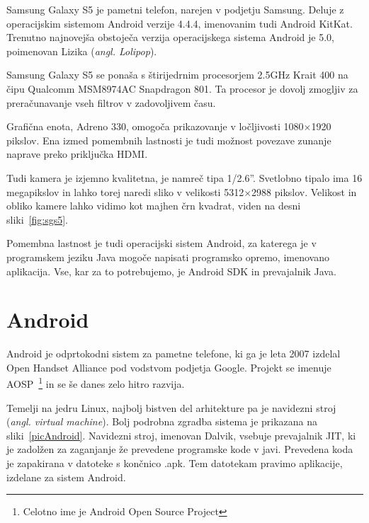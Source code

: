 \documentclass[a4paper, 12pt]{book}
\begin{document}
Samsung Galaxy S5 je pametni telefon, narejen v podjetju Samsung. Deluje z
operacijskim sistemom Android verzije 4.4.4, imenovanim tudi Android KitKat.
Trenutno najnovejša obstoječa verzija operacijskega sistema Android je 5.0,
poimenovan Lizika (\textit{angl. Lolipop}).

Samsung Galaxy S5 se ponaša s štirijedrnim procesorjem 2.5GHz Krait 400 na
čipu Qualcomm MSM8974AC Snapdragon 801. Ta procesor je dovolj zmogljiv za
preračunavanje vseh filtrov v zadovoljivem času.

Grafična enota, Adreno 330, omogoča prikazovanje v ločljivosti
1080$\times$1920 pikslov. Ena izmed pomembnih lastnosti je tudi možnost povezave
zunanje naprave preko priključka HDMI.

Tudi kamera je izjemno kvalitetna, je namreč tipa 1/2.6''. Svetlobno tipalo
ima 16 megapikslov in lahko torej naredi sliko v velikosti 5312$\times$2988
pikslov. Velikost in obliko kamere lahko vidimo kot majhen črn kvadrat, viden
na desni sliki~\ref{fig:sgs5}.

Pomembna lastnost je tudi operacijski sistem Android, za katerega je v
programskem jeziku Java mogoče napisati programsko opremo, imenovano
aplikacija. Vse, kar za to potrebujemo, je Android SDK in prevajalnik Java.


\section{Android}
\label{sec:android}
Android je odprtokodni sistem za pametne telefone, ki ga je leta 2007 izdelal
Open Handset Alliance pod vodstvom podjetja Google. Projekt se imenuje
AOSP~\footnote{Celotno ime je Android Open Source Project} in se še danes zelo
hitro razvija.

Temelji na jedru Linux, najbolj bistven del arhitekture pa je navidezni stroj
(\textit{angl. virtual machine}). Bolj podrobna zgradba sistema je prikazana
na sliki~\ref{picAndroid}. Navidezni stroj, imenovan Dalvik,
vsebuje prevajalnik JIT, ki je zadolžen za zaganjanje že prevedene programske
kode v javi. Prevedena koda je zapakirana v datoteke s končnico .apk. Tem
datotekam pravimo aplikacije, izdelane za sistem Android.
\end{document}
